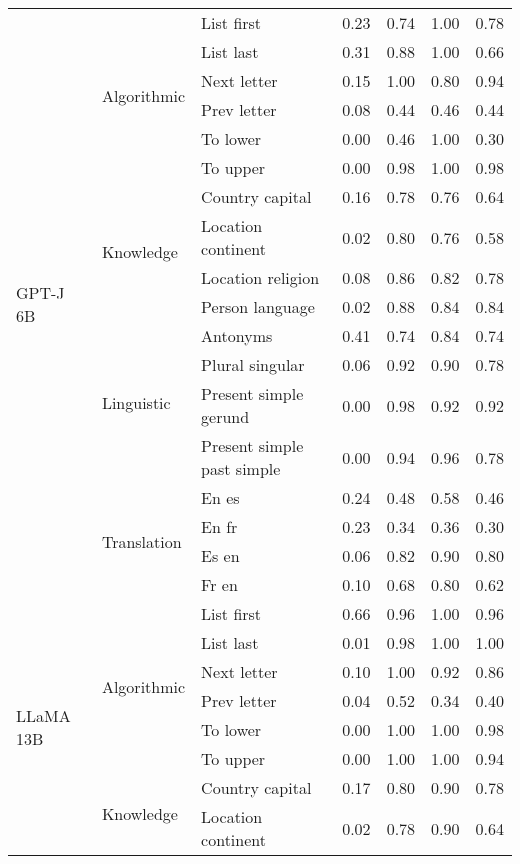 \begin{center}
\begin{longtable}{lllrrrr}
\multirow[t]{18}{*}{GPT-J 6B} & \multirow[t]{6}{*}{Algorithmic} & List first & 0.23 & 0.74 & 1.00 & 0.78 \\
 &  & List last & 0.31 & 0.88 & 1.00 & 0.66 \\
 &  & Next letter & 0.15 & 1.00 & 0.80 & 0.94 \\
 &  & Prev letter & 0.08 & 0.44 & 0.46 & 0.44 \\
 &  & To lower & 0.00 & 0.46 & 1.00 & 0.30 \\
 &  & To upper & 0.00 & 0.98 & 1.00 & 0.98 \\
\cline{2-7}
 & \multirow[t]{4}{*}{Knowledge} & Country capital & 0.16 & 0.78 & 0.76 & 0.64 \\
 &  & Location continent & 0.02 & 0.80 & 0.76 & 0.58 \\
 &  & Location religion & 0.08 & 0.86 & 0.82 & 0.78 \\
 &  & Person language & 0.02 & 0.88 & 0.84 & 0.84 \\
\cline{2-7}
 & \multirow[t]{4}{*}{Linguistic} & Antonyms & 0.41 & 0.74 & 0.84 & 0.74 \\
 &  & Plural singular & 0.06 & 0.92 & 0.90 & 0.78 \\
 &  & Present simple gerund & 0.00 & 0.98 & 0.92 & 0.92 \\
 &  & Present simple past simple & 0.00 & 0.94 & 0.96 & 0.78 \\
\cline{2-7}
 & \multirow[t]{4}{*}{Translation} & En es & 0.24 & 0.48 & 0.58 & 0.46 \\
 &  & En fr & 0.23 & 0.34 & 0.36 & 0.30 \\
 &  & Es en & 0.06 & 0.82 & 0.90 & 0.80 \\
 &  & Fr en & 0.10 & 0.68 & 0.80 & 0.62 \\
\cline{1-7} \cline{2-7}
\multirow[t]{18}{*}{LLaMA 13B} & \multirow[t]{6}{*}{Algorithmic} & List first & 0.66 & 0.96 & 1.00 & 0.96 \\
 &  & List last & 0.01 & 0.98 & 1.00 & 1.00 \\
 &  & Next letter & 0.10 & 1.00 & 0.92 & 0.86 \\
 &  & Prev letter & 0.04 & 0.52 & 0.34 & 0.40 \\
 &  & To lower & 0.00 & 1.00 & 1.00 & 0.98 \\
 &  & To upper & 0.00 & 1.00 & 1.00 & 0.94 \\
\cline{2-7}
 & \multirow[t]{4}{*}{Knowledge} & Country capital & 0.17 & 0.80 & 0.90 & 0.78 \\
 &  & Location continent & 0.02 & 0.78 & 0.90 & 0.64 \\

\end{longtable}
\end{center}
